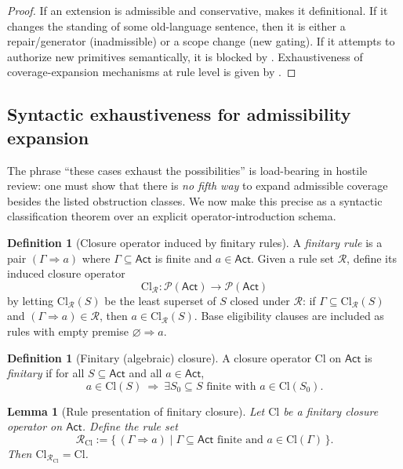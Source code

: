 \documentclass[11pt]{article}
\newtheorem{lemma}[theorem]{Lemma}
\theoremstyle{definition}
\newtheorem{definition}[theorem]{Definition}
\newcommand{\Act}{\mathsf{Act}}
\begin{document}
\begin{proof}
If an extension is admissible and conservative,  makes it definitional.
If it changes the standing of some old-language sentence, then it is either a repair/generator (inadmissible) or a scope change (new gating).
If it attempts to authorize new primitives semantically, it is blocked by .
Exhaustiveness of coverage-expansion mechanisms at rule level is given by .
\end{proof}
\subsection{Syntactic exhaustiveness for admissibility expansion}
\label{sec:syntactic}

The phrase ``these cases exhaust the possibilities'' is load-bearing in hostile review: one must show that there is \emph{no fifth way} to expand admissible coverage besides the listed obstruction classes.
We now make this precise as a syntactic classification theorem over an explicit operator-introduction schema.

\begin{definition}[Closure operator induced by finitary rules]
\label{def:closure-operator}
A \emph{finitary rule} is a pair $(\Gamma\Rightarrow a)$ where $\Gamma\subseteq\Act$ is finite and $a\in\Act$.
Given a rule set $\mathcal{R}$, define its induced closure operator
\[
\mathrm{Cl}_{\mathcal{R}}:\mathcal{P}(\Act)\to\mathcal{P}(\Act)
\]
by letting $\mathrm{Cl}_{\mathcal{R}}(S)$ be the least superset of $S$ closed under $\mathcal{R}$:
if $\Gamma\subseteq \mathrm{Cl}_{\mathcal{R}}(S)$ and $(\Gamma\Rightarrow a)\in\mathcal{R}$, then $a\in \mathrm{Cl}_{\mathcal{R}}(S)$.
Base eligibility clauses are included as rules with empty premise $\varnothing\Rightarrow a$.
\end{definition}

\begin{definition}[Finitary (algebraic) closure]
\label{def:finitary-closure}
A closure operator $\mathrm{Cl}$ on $\Act$ is \emph{finitary} if for all $S\subseteq\Act$ and all $a\in\Act$,
\[
a\in \mathrm{Cl}(S)\ \Rightarrow\ \exists S_0\subseteq S \text{ finite with } a\in \mathrm{Cl}(S_0).
\]
\end{definition}

\begin{lemma}[Rule presentation of finitary closure]
\label{lem:rule-presentation}
Let $\mathrm{Cl}$ be a finitary closure operator on $\Act$.
Define the rule set
\[
\mathcal{R}_{\mathrm{Cl}} := \{\,(\Gamma\Rightarrow a)\mid \Gamma\subseteq\Act\text{ finite and } a\in \mathrm{Cl}(\Gamma)\,\}.
\]
Then $\mathrm{Cl}_{\mathcal{R}_{\mathrm{Cl}}}=\mathrm{Cl}$.
\end{lemma}
\end{document}
